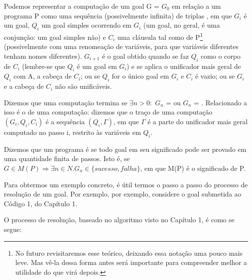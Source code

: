 \documentclass{article}
\begin{document}
Podemos representar a computação de um goal G = $G_0$ em relação a um programa P como uma sequência (possivelmente infinita) de triplas , em que $G_i$ é um
goal, $Q_i$ um goal simples ocorrendo em $G_i$ (um goal, no geral, é uma conjunção: um goal simples não) e $C_i$ uma cláusula tal como   de P\footnote{No futuro revisitaremos esse  teórico, deixando essa notação uma pouco mais leve. Mas vê-la dessa forma antes será importante para compreender melhor a utilidade do que virá depois.} (possivelmente com uma renomeação de variáveis, para que variáveis diferentes tenham nomes diferentes). $G_{i+1}$
é o goal obtido quando se faz $Q_i$ como o corpo de $C_i$ (lembre-se que $Q_i$ é um goal em $G_i$) e se aplica o unificador mais geral de $Q_i$ com A, a cabeça de $C_i$; ou  se $Q_i$ for o único goal em $G_i$ e $C_i$ é vazio; ou  se $G_i$ e a cabeça de $C_i$ não são unificáveis.

Dizemos que uma computação termina se $\exists n > 0:$ $G_n$ =  ou $G_n$ = . Relacionado a isso é o  de uma computação: dizemos que o traço de uma computação $(G_i, Q_i, C_i)$ é a sequência $(Q_i, \Gamma)$, em que $\Gamma$ é a parte do unificador mais geral computado no passo i, restrito às variáveis em $Q_i$.

Dizemos que um programa é  se todo goal em seu significado pode ser provado em uma quantidade finita de passos. Isto é, se $G \in M(P) \Rightarrow \exists n \in N. G_n \in \{sucesso, falha\}$, em que M(P) é o significado de P.

Para obtermos um exemplo concreto, é útil termos o passo a passo do processo de resolução de um goal. Por exemplo, por exemplo, considere o goal  submetida ao Código 1, do Capítulo 1.

O processo de resolução, baseado no algoritmo visto no Capítulo 1, é como se segue:
\end{document}
